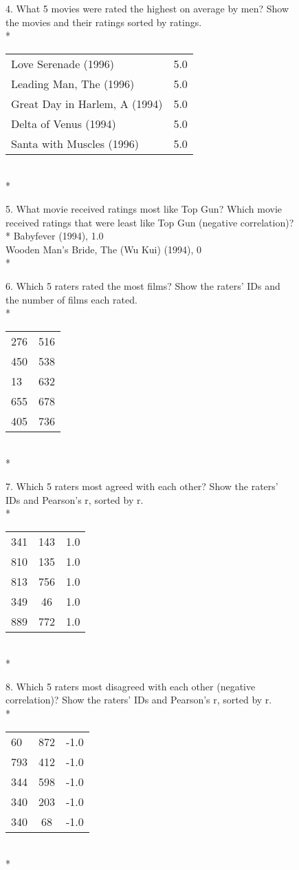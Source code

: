 \documentclass{article}
\begin{document}
4.  What 5 movies were rated the highest on average by men? Show\\
the movies and their ratings sorted by ratings.\\*
\begin{tabular}{ l r }
Love Serenade (1996) & 5.0 \\
Leading Man, The (1996) & 5.0 \\
Great Day in Harlem, A (1994) & 5.0 \\
Delta of Venus (1994) & 5.0 \\
Santa with Muscles (1996) & 5.0 \\
\end{tabular}
\\*

5.  What movie received ratings most like Top Gun? Which movie\\
received ratings that were least like Top Gun (negative correlation)?\\*
Babyfever (1994), 1.0\\
Wooden Man's Bride, The (Wu Kui) (1994), 0
\\*

6.  Which 5 raters rated the most films? Show the raters' IDs and\\
the number of films each rated.\\*
\begin{tabular}{ l r }
276 & 516 \\
450 & 538 \\
13 & 632 \\
655 & 678 \\
405 & 736 \\
\end{tabular}
\\*

7.  Which 5 raters most agreed with each other? Show the raters'\\
IDs and Pearson's r, sorted by r.\\*
\begin{tabular}{ l c r }
341 & 143 & 1.0 \\
810 & 135 & 1.0 \\
813 & 756 & 1.0 \\
349 & 46 & 1.0 \\
889 & 772 & 1.0 \\
\end{tabular}
\\*

8.  Which 5 raters most disagreed with each other (negative\\
correlation)? Show the raters' IDs and Pearson's r, sorted by r.\\*
\begin{tabular}{ l c r }
60 & 872 & -1.0 \\
793 & 412 & -1.0 \\
344 & 598 & -1.0 \\
340 & 203 & -1.0 \\
340 & 68 & -1.0 \\
\end{tabular}
\\*
\end{document}
